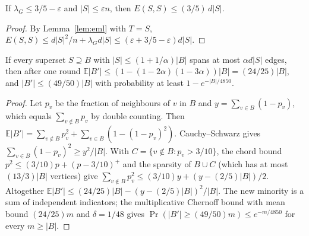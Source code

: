 \begin{lemma}\label{lem:sparse}
\leanok{}
If $\lambda_G\le 3/5-\varepsilon$ and $|S|\le\varepsilon n$, then $E(S,S)\le (3/5)\,d|S|$.
\end{lemma}
\begin{proof}\leanok
By Lemma~\ref{lem:eml} with $T=S$,
$E(S,S)\le d|S|^2/n+\lambda_Gd|S|\le(\varepsilon+3/5-\varepsilon)d|S|$.
\end{proof}

\begin{lemma}[One round, the paper's Lemma~5 at $\alpha=3/10$]\label{lem:phase2}
\leanok{}
If every superset $S\supseteq B$ with $|S|\le(1+1/\alpha)|B|$ spans at most $\alpha d|S|$ edges,
then after one round $\mathbb E|B'|\le(1-(1-2\alpha)(1-3\alpha))|B|=(24/25)|B|$, and
$|B'|\le(49/50)|B|$ with probability at least $1-e^{-|B|/4850}$.
\end{lemma}
\begin{proof}\leanok
Let $p_v$ be the fraction of neighbours of $v$ in $B$ and $y=\sum_{v\in B}(1-p_v)$, which equals
$\sum_{v\notin B}p_v$ by double counting. Then
$\mathbb E|B'|=\sum_{v\notin B}p_v^2+\sum_{v\in B}(1-(1-p_v)^2)$. Cauchy--Schwarz gives
$\sum_{v\in B}(1-p_v)^2\ge y^2/|B|$. With $C=\{v\notin B:p_v>3/10\}$, the chord bound
$p^2\le(3/10)p+(p-3/10)^+$ and the sparsity of $B\cup C$ (which has at most $(13/3)|B|$
vertices) give $\sum_{v\notin B}p_v^2\le(3/10)y+(y-(2/5)|B|)/2$. Altogether
$\mathbb E|B'|\le(24/25)|B|-(y-(2/5)|B|)^2/|B|$. The new minority is a sum of independent
indicators; the multiplicative Chernoff bound with mean bound $(24/25)m$ and $\delta=1/48$ gives
$\Pr(|B'|\ge(49/50)m)\le e^{-m/4850}$ for every $m\ge|B|$.
\end{proof}

